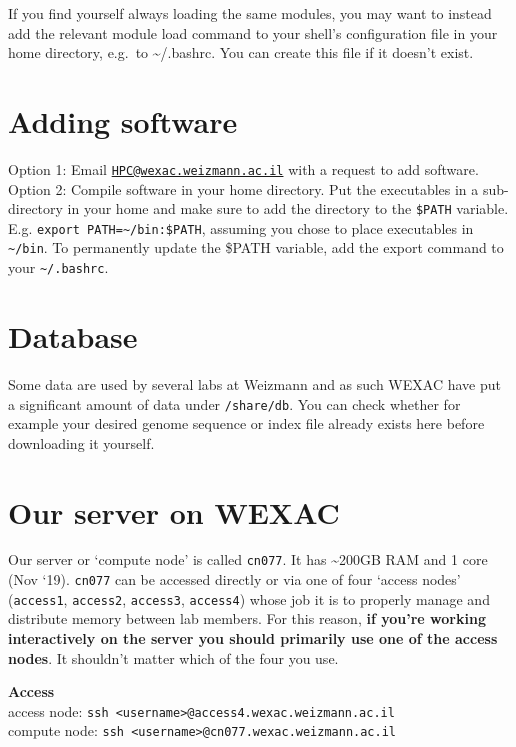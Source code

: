 \documentclass[]{book}
\begin{document}
If you find yourself always loading the same modules, you may want to
instead add the relevant module load command to your shell's
configuration file in your home directory, e.g.~to
\textasciitilde{}/.bashrc. You can create this file if it doesn't exist.

\section{Adding software}\label{adding-software}

Option 1: Email
\href{mailto:HPC@wexac.weizmann.ac.il}{\nolinkurl{HPC@wexac.weizmann.ac.il}}
with a request to add software.\\
Option 2: Compile software in your home directory. Put the executables
in a sub-directory in your home and make sure to add the directory to
the \texttt{\$PATH} variable. E.g.
\texttt{export\ PATH=\textasciitilde{}/bin:\$PATH}, assuming you chose
to place executables in \texttt{\textasciitilde{}/bin}. To permanently
update the \$PATH variable, add the export command to your
\texttt{\textasciitilde{}/.bashrc}.

\section{Database}\label{database}

Some data are used by several labs at Weizmann and as such WEXAC have
put a significant amount of data under \texttt{/share/db}. You can check
whether for example your desired genome sequence or index file already
exists here before downloading it yourself.

\section{Our server on WEXAC}\label{our-server-on-wexac}

Our server or `compute node' is called \texttt{cn077}. It has
\textasciitilde{}200GB RAM and 1 core (Nov `19). \texttt{cn077} can be
accessed directly or via one of four `access nodes' (\texttt{access1},
\texttt{access2}, \texttt{access3}, \texttt{access4}) whose job it is to
properly manage and distribute memory between lab members. For this
reason, \textbf{if you're working interactively on the server you should
primarily use one of the access nodes}. It shouldn't matter which of the
four you use.

\textbf{Access}\\
access node:
\texttt{ssh\ \textless{}username\textgreater{}@access4.wexac.weizmann.ac.il}\\
compute node:
\texttt{ssh\ \textless{}username\textgreater{}@cn077.wexac.weizmann.ac.il}
\end{document}
